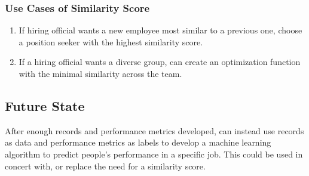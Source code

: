 \subsubsection{Use Cases of Similarity Score}

\begin{enumerate}
\item If hiring official wants a new employee most similar to a previous one, choose a position seeker with the highest similarity score.
\item If a hiring official wants a diverse group, can create an optimization function with the minimal similarity across the team.
\end{enumerate}


\subsection{Future State}

After enough records and performance metrics developed, can instead use records as data and performance metrics as labels to develop a machine learning algorithm to predict people's performance in a specific job. This could be used in concert with, or replace the need for a similarity score.